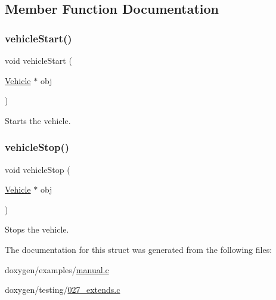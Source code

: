 \subsection{Member Function Documentation}
\mbox{\label{struct_vehicle_a6891d3d28853bc3fdd075596dc6de9f8}} 
\subsubsection{\texorpdfstring{vehicleStart()}{vehicleStart()}}
{\footnotesize\ttfamily void vehicle\+Start (\begin{DoxyParamCaption}\item[{\mbox{\hyperlink{struct_vehicle}{Vehicle}} $\ast$}]{obj }\end{DoxyParamCaption})}

Starts the vehicle. \mbox{\label{struct_vehicle_a4dcbcba43792dcd673a552b14479ab77}} 
\subsubsection{\texorpdfstring{vehicleStop()}{vehicleStop()}}
{\footnotesize\ttfamily void vehicle\+Stop (\begin{DoxyParamCaption}\item[{\mbox{\hyperlink{struct_vehicle}{Vehicle}} $\ast$}]{obj }\end{DoxyParamCaption})}

Stops the vehicle. 

The documentation for this struct was generated from the following files\+:\begin{DoxyCompactItemize}
\item 
doxygen/examples/\mbox{\hyperlink{manual_8c}{manual.\+c}}\item 
doxygen/testing/\mbox{\hyperlink{027__extends_8c}{027\+\_\+extends.\+c}}\end{DoxyCompactItemize}
